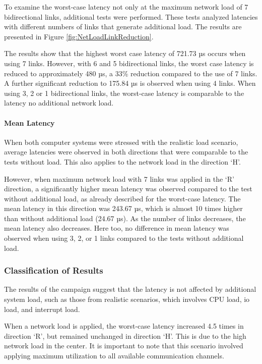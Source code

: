 To examine the worst-case latency not only at the maximum network load of 7 bidirectional links, additional tests were performed. These tests analyzed latencies with different numbers of links that generate additional load. The results are presented in Figure \ref{fig:NetLoadLinkReduction}.

The results show that the highest worst case latency of 721.73 µs occurs when using 7 links. However, with 6 and 5 bidirectional links, the worst case latency is reduced to approximately 480 µs, a 33\% reduction compared to the use of 7 links. A further significant reduction to 175.84 µs is observed when using 4 links. When using 3, 2 or 1 bidirectional links, the worst-case latency is comparable to the latency no additional network load.

\paragraph{Mean Latency}
When both computer systems were stressed with the realistic load scenario, average latencies were observed in both directions that were comparable to the tests without load. This also applies to the network load in the direction `H'.

However, when maximum network load with 7 links was applied in the `R' direction, a significantly higher mean latency was observed compared to the test without additional load, as already described for the worst-case latency. The mean latency in this direction was 243.67 µs, which is almost 10 times higher than without additional load (24.67 µs). As the number of links decreases, the mean latency also decreases. Here too, no difference in mean latency was observed when using 3, 2, or 1 links compared to the tests without additional load.

\subsubsection{Classification of Results}
The results of the campaign suggest that the latency is not affected by additional system load, such as those from realistic scenarios, which involves \ac{CPU} load, \ac{io} load, and interrupt load.

When a network load is applied, the worst-case latency increased 4.5 times in direction `R', but remained unchanged in direction `H'. This is due to the high network load in the center. It is important to note that this scenario involved applying maximum utilization to all available communication channels.

